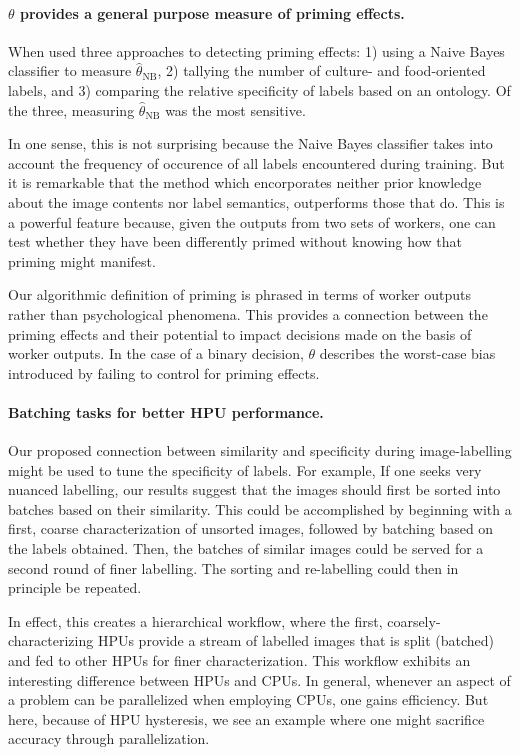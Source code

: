 \documentclass[a4paper]{report}
\begin{document}
\paragraph{$\theta$ provides a general purpose measure of priming effects.}
When used three approaches to detecting priming effects: 1) using a Naive Bayes
classifier to measure $\hat{\theta}_\text{NB}$, 2) tallying the number of 
culture- and food-oriented labels, and 3) comparing the relative specificity
of labels based on an ontology.  Of the three, measuring $
\hat{\theta}_\text{NB}$ was the most sensitive.  

In one sense, this is not surprising because the Naive 
Bayes classifier takes into account the frequency of occurence of all labels 
encountered during training.  But it is remarkable that the 
method which encorporates neither prior knowledge about the image contents nor 
label semantics, outperforms those that do.  This is a powerful feature 
because, given the outputs from two sets of workers, one can test whether they 
have been differently primed without knowing how that priming might manifest.

Our algorithmic definition of priming is phrased in terms of worker outputs
rather than psychological phenomena.  This provides a connection between
the priming effects and their potential to impact decisions made on the basis
of worker outputs.  In the case of a binary decision, $\theta$
describes the worst-case bias introduced by failing to control for priming 
effects.

\paragraph{Batching tasks for better HPU performance.}
Our proposed connection between similarity and specificity during 
image-labelling might be used to tune the specificity of labels.  For example,
If one seeks very nuanced labelling, our results suggest that the images 
should first be sorted into batches based on their similarity. This could be 
accomplished by beginning with a first, coarse characterization of unsorted 
images, followed by batching based on the labels obtained. Then, the batches
of similar images could be served for a second round of finer labelling. 
The sorting and re-labelling could then in principle be repeated.

In effect, this creates a hierarchical workflow, where the first, 
coarsely-characterizing HPUs provide a stream of labelled images that is 
split (batched) and fed to other HPUs for finer characterization.  This 
workflow exhibits an interesting difference between HPUs and CPUs.  In general,
whenever an aspect of a problem can be parallelized when employing CPUs, one
gains efficiency.  But here, because of HPU hysteresis, we see an example where
one might sacrifice accuracy through parallelization.
\end{document}
